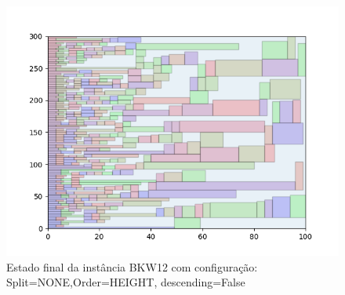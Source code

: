 \begin{figure}[H]
    \centering
    \caption[]{Estado final da instância BKW12 com configuração: Split=NONE,Order=HEIGHT, descending=False}
    \label{fig:bkw12-none-height-false}
    \includegraphics[scale=0.5]{output/figures/bkw/bkw12/none/height/false/000}
\end{figure}